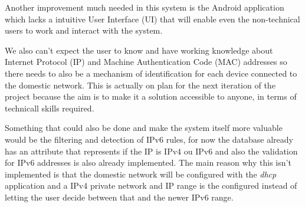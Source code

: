 Another improvement much needed in this system is the Android application which
lacks a intuitive User Interface (UI) that will enable even the non-technical
users to work and interact with the system.

We also can't expect the user to
know and have working knowledge about Internet Protocol (IP) and
Machine Authentication Code (MAC) addresses so there needs to also be a
mechanism of identification for each device connected to the domestic network.
This is actually on plan for the next iteration of the project because the aim
is to make it a solution accessible to anyone, in terms of technicall skills
required.

Something that could also be done and make the system itself more valuable would
be the filtering and detection of IPv6 rules, for now the database already has
an attribute that represents if the IP is IPv4 ou IPv6 and also the validation
for IPv6 addresses is also already implemented. The main reason why this isn't
implemented is that the domestic network will be configured with the \emph{dhcp}
application and a IPv4 private network and IP range is the configured instead of
letting the user decide between that and the newer IPv6 range.




